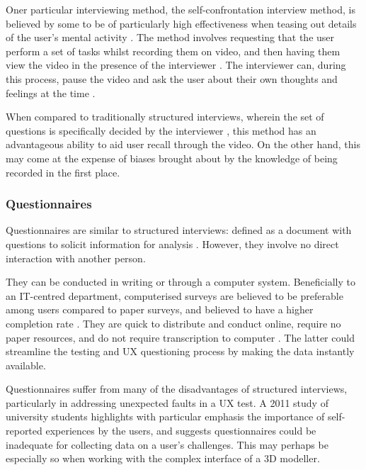 \documentclass{scrartcl}
\begin{document}
Oner particular interviewing method, the self-confrontation interview method, is believed by some to be of particularly high effectiveness when teasing out details of the user's mental activity \cite{bach_combining_2011} \cite{lim_self-confrontation_2002}. The method involves requesting that the user perform a set of tasks whilst recording them on video, and then having them view the video in the presence of the interviewer \cite{cranach_analysis_1982}. The interviewer can, during this process, pause the video and ask the user about their own thoughts and feelings at the time \cite{lim_self-confrontation_2002}.

When compared to traditionally structured interviews, wherein the set of questions is specifically decided by the interviewer \cite{wilson_interview_2013}, this method has an advantageous ability to aid user recall \cite{lim_self-confrontation_2002} through the video. On the other hand, this may come at the expense of biases \cite{henry_video_2012} brought about by the knowledge of being recorded in the first place.

\subsubsection{Questionnaires}
Questionnaires are similar to structured interviews: defined as a document with questions to solicit information for analysis \cite{acharya2010questionnaire}. However, they involve no direct interaction with another person. 

They can be conducted in writing or through a computer system. Beneficially to an IT-centred department, computerised surveys are believed to be preferable among users compared to paper surveys, and believed to have a higher completion rate \cite{computersurveys}. They are quick to distribute and conduct online, require no paper resources, and do not require transcription to computer \cite{wright_researching_2005}. The latter could streamline the testing and UX questioning process by making the data instantly available.

Questionnaires suffer from many of the disadvantages of structured interviews, particularly in addressing unexpected faults in a UX test. A 2011 study of university students \cite{bach_combining_2011} highlights with particular emphasis the importance of self-reported experiences by the users, and suggests questionnaires could be inadequate for collecting data on a user's challenges. This may perhaps be especially so when working with the complex interface of a 3D modeller.
\end{document}
